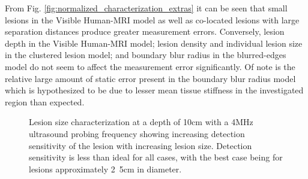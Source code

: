 			From Fig. \ref{fig:normalized_characterization_extras} it can be seen that small lesions in the Visible Human-MRI model as well as co-located lesions with large separation distances produce greater measurement errors. Conversely, lesion depth in the Visible Human-MRI model; lesion density and individual lesion size in the clustered lesion model; and boundary blur radius in the blurred-edges model do not seem to affect the measurement error significantly. Of note is the relative large amount of static error present in the boundary blur radius model which is hypothesized to be due to lesser mean tissue stiffness in the investigated region than expected.

			\begin{figure}[!t]
				\centering
				\caption[Lesion size characterization]{Lesion size characterization at a depth of \unit{10}{cm} with a \unit{4}{MHz} ultrasound probing frequency showing increasing detection sensitivity of the lesion with increasing lesion size. Detection sensitivity is less than ideal for all cases, with the best case being for lesions approximately \unit{2.5}{cm} in diameter.}
				\label{fig:size_characterization}
			\end{figure}

